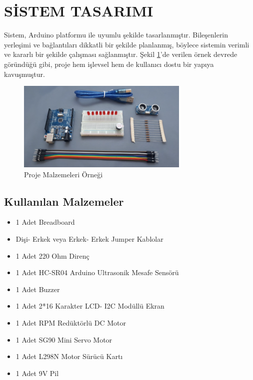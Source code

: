 \section{SİSTEM TASARIMI}
    Sistem, Arduino platformu ile uyumlu şekilde tasarlanmıştır. Bileşenlerin yerleşimi ve bağlantıları dikkatli bir şekilde planlanmış, böylece sistemin verimli ve kararlı bir şekilde çalışması sağlanmıştır. Şekil \ref{fig:4}'de verilen örnek devrede göründüğü gibi, proje hem işlevsel hem de kullanıcı dostu bir yapıya kavuşmuştur.
\begin{figure}[H]
\centering
\includegraphics[width=0.73\textwidth]{Resimler/4.png}
\caption{Proje Malzemeleri Örneği}
\label{fig:4}
\end{figure}
\subsection{Kullanılan Malzemeler}
\begin{itemize}
    \item 1 Adet Breadboard
    \item Dişi- Erkek veya Erkek- Erkek Jumper Kablolar
    \item 1 Adet 220 Ohm Direnç
    \item 1 Adet HC-SR04 Arduino Ultrasonik Mesafe Sensörü
    \item 1 Adet Buzzer
    \item 1 Adet 2*16 Karakter LCD- I2C Modüllü Ekran
    \item 1 Adet RPM Redüktörlü DC Motor
    \item 1 Adet SG90 Mini Servo Motor
    \item 1 Adet L298N Motor Sürücü Kartı
    \item 1 Adet 9V Pil
    \end{itemize}

